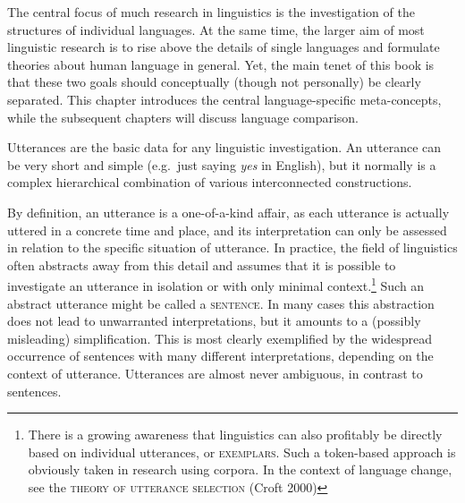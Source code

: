 \label{ch:languagespecific}

The central focus of much research in linguistics is the investigation of the structures of individual languages. At the same time, the larger aim of most linguistic research is to rise above the details of single languages and formulate theories about human language in general. Yet, the main tenet of this book is that these two goals should conceptually (though not personally) be clearly separated. This chapter introduces the central language-specific meta-concepts, while the subsequent chapters will discuss language comparison.

%
Utterances are the basic data for any linguistic investigation. An utterance can be very short and simple (e.g.~just saying \emph{yes} in English), but it normally is a complex hierarchical combination of various interconnected constructions. 

By definition, an utterance is a one-of-a-kind affair, as each utterance is actually uttered in a concrete time and place, and its interpretation can only be assessed in relation to the specific situation of utterance. In practice, the field of linguistics often abstracts away from this detail and assumes that it is possible to investigate an utterance in isolation or with only minimal context.\footnote{There is a growing awareness that linguistics can also profitably be directly based on individual utterances, or \textsc{exemplars}. Such a token-based approach is obviously taken in research using corpora. In the context of language change, see the \textsc{theory of utterance selection} (Croft 2000)} Such an abstract utterance might be called a \textsc{sentence}. In many cases this abstraction does not lead to unwarranted interpretations, but it amounts to a (possibly misleading) simplification. This is most clearly exemplified by the widespread occurrence of sentences with many different interpretations, depending on the context of utterance. Utterances are almost never ambiguous, in contrast to sentences.

